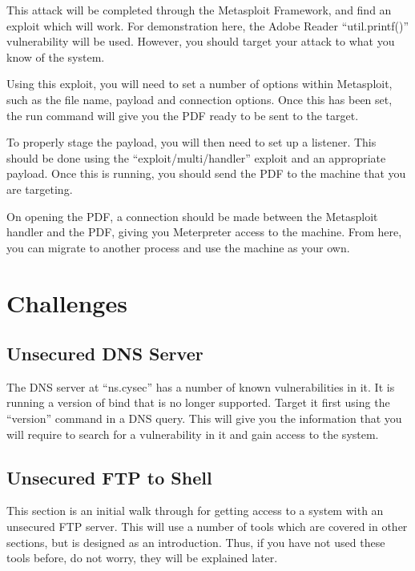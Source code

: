			This attack will be completed through the Metasploit Framework, and find an exploit which will work. 
			For demonstration here, the Adobe Reader ``util.printf()'' vulnerability will be used. 
			However, you should target your attack to what you know of the system. 

			Using this exploit, you will need to set a number of options within Metasploit, such as the file name, payload and connection options. 
			Once this has been set, the run command will give you the PDF ready to be sent to the target. 

			To properly stage the payload, you will then need to set up a listener. 
			This should be done using the ``exploit/multi/handler'' exploit and an appropriate payload. 
			Once this is running, you should send the PDF to the machine that you are targeting. 

			On opening the PDF, a connection should be made between the Metasploit handler and the PDF, giving you Meterpreter access to the machine. 
			From here, you can migrate to another process and use the machine as your own. 
	\section{Challenges}
	\subsection{Unsecured DNS Server}
		The DNS server at ``ns.cysec'' has a number of known vulnerabilities in it. 
		It is running a version of bind that is no longer supported. 
		Target it first using the ``version'' command in a DNS query. 
		This will give you the information that you will require to search for a vulnerability in it and gain access to the system. 

		\subsection{Unsecured FTP to Shell}
			This section is an initial walk through for getting access to a system with an unsecured FTP server. 
			This will use a number of tools which are covered in other sections, but is designed as an introduction. 
			Thus, if you have not used these tools before, do not worry, they will be explained later. 

